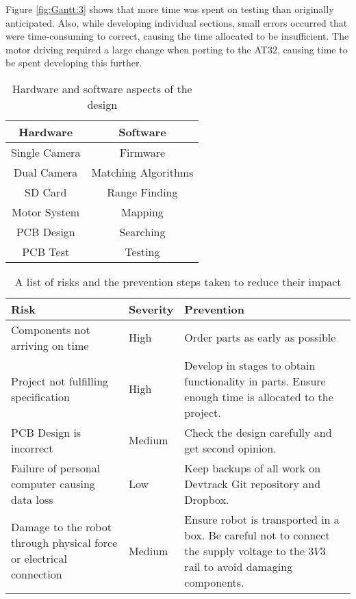 Figure \ref{fig:Gantt:3} shows that more time was spent on testing than originally anticipated. Also, while developing individual sections, small errors occurred that were time-consuming to correct, causing the time allocated to be insufficient. The motor driving required a large change when porting to the AT32, causing time to be spent developing this further. 

\begin{table}
\centering
\caption{Hardware and software aspects of the design}
\label{table:sections}
\begin{tabular}{cc}\toprule
\textbf{Hardware} & \textbf{Software} \\ \toprule
Single Camera	&	Firmware \\ \midrule
Dual Camera		&	Matching Algorithms \\ \midrule
SD Card			&	Range Finding \\ \midrule
Motor System	&	Mapping  \\ \midrule
PCB Design		&	Searching \\ \midrule
PCB Test		&	Testing \\ \bottomrule
\end{tabular}
\end{table}

\begin{table}
\centering
\caption{A list of risks and the prevention steps taken to reduce their impact}
\label{tab:risk}
\begin{tabular}{p{6cm}p{2cm}p{6cm}}\toprule
\textbf{Risk}						&	\textbf{Severity}	&	\textbf{Prevention} \\ \toprule
Components not arriving on time	&	High		&	Order parts as early as possible \\ \midrule
Project not fulfilling specification				&	High		&	Develop in stages to obtain functionality in parts. Ensure enough time is allocated to the project.	\\\midrule
PCB Design is incorrect		&	Medium		&	Check the design carefully and get second opinion. \\\midrule
Failure of personal computer causing data loss & Low	& 	Keep backups of all work on Devtrack Git repository and Dropbox.\\ \midrule
Damage to the robot through physical force or electrical connection & Medium & Ensure robot is transported in a box. Be careful not to connect the supply voltage to the $3V3$ rail to avoid damaging components. \\
\bottomrule
\end{tabular}
\end{table}

